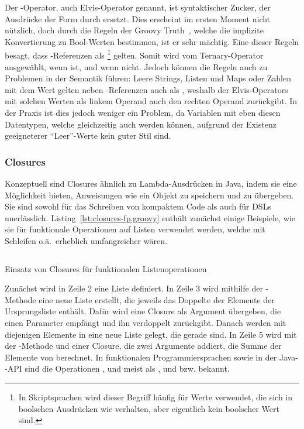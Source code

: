 \documentclass[a4paper]{article}
\newcommand{\codelisting}[3]{
\begin{listing}[ht]
	\inputminted{#1}{#1/#2}
	\vspace{-3ex}
	\caption{#3}
	\label{lst:#2}
\end{listing}
}
\begin{document}
Der -Operator, auch Elvis-Operator genannt, ist syntaktischer Zucker, der Ausdrücke der Form  durch  ersetzt.
Dies erscheint im ersten Moment nicht nützlich, doch durch die Regeln der Groovy Truth~\cite[Abs.~5.]{groovy-lang:semantics}, welche die implizite Konvertierung zu Bool-Werten bestimmen, ist er sehr mächtig.
Eine dieser Regeln besagt, dass -Referenzen als \footnote{In Skriptsprachen wird dieser Begriff häufig für Werte verwendet, die sich in boolschen Ausdrücken wie  verhalten, aber eigentlich kein boolscher Wert sind.} gelten.
Somit wird  vom Ternary-Operator ausgewählt, wenn   ist, und  wenn nicht.
Jedoch können die Regeln auch zu Problemen in der Semantik führen:
Leere Strings, Listen und Maps oder Zahlen mit dem Wert  gelten neben -Referenzen auch als , weshalb der Elvis-Operators mit solchen Werten als linkem Operand auch den rechten Operand zurückgibt.
In der Praxis ist dies jedoch weniger ein Problem, da Variablen mit eben diesen Datentypen, welche gleichzeitig auch  werden können, aufgrund der Existenz geeigneterer ``Leer''-Werte kein guter Stil sind.

\subsubsection{Closures}\label{subsubsec:closures}

Konzeptuell sind Closures ähnlich zu Lambda-Ausdrücken in Java, indem sie eine Möglichkeit bieten, Anweisungen wie ein Objekt zu speichern und zu übergeben.
Sie sind sowohl für das Schreiben von kompaktem Code als auch für DSLs unerlässlich.
Listing~\ref{lst:closures-fp.groovy} enthält zunächst einige Beispiele, wie sie für funktionale Operationen auf Listen verwendet werden, welche mit Schleifen o.ä.~erheblich umfangreicher wären.

\codelisting{groovy}{closures-fp.groovy}{Einsatz von Closures für funktionalen Listenoperationen}

Zunächst wird in Zeile 2 eine Liste definiert.
In Zeile 3 wird mithilfe der -Methode eine neue Liste erstellt, die jeweils das Doppelte der Elemente der Ursprungsliste enthält.
Dafür wird eine Closure als Argument übergeben, die einen Parameter  empfängt und ihn verdoppelt zurückgibt.
Danach werden mit  diejenigen Elemente in eine neue Liste gelegt, die gerade sind.
In Zeile 5 wird mit der -Methode und einer Closure, die zwei Argumente addiert, die Summe der Elemente von  berechnet.
In funktionalen Programmiersprachen sowie in der Java--API sind die Operationen ,  und  meist als ,  und  bzw.  bekannt.
\end{document}
